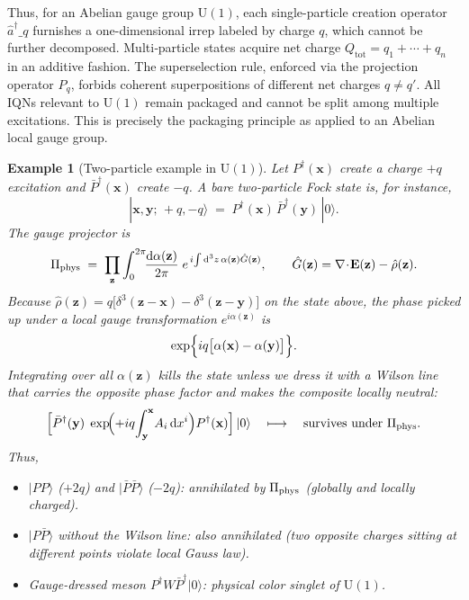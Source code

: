 \documentclass[12pt,a4paper]{article}
\newtheorem{example}{Example}
\begin{document}
Thus, for an Abelian gauge group $\mathrm{U}(1)$, each single-particle creation operator $\hat a^\dagger\_q$ furnishes a one-dimensional irrep labeled by charge $q$, which cannot be further decomposed.
Multi‐particle states acquire net charge $Q_\text{tot}= q_1+\cdots +q_n$ in an additive fashion.
The superselection rule, enforced via the projection operator $P_q$, forbids coherent superpositions of different net charges $q\neq q'$. 
All IQNs relevant to $\mathrm{U}(1)$ remain packaged and cannot be split among multiple excitations.
This is precisely the packaging principle as applied to an Abelian local gauge group.


\begin{example}[Two-particle example in $\mathrm{U}(1)$]	
	Let $P^\dagger(\mathbf x)$ create a charge $+q$ excitation and
	$\bar P^\dagger(\mathbf x)$ create $-q$.
	A bare two-particle Fock state is, for instance,
	$$
	|\mathbf x,\mathbf y;\,+q,-q\rangle\;=\;
	P^\dagger(\mathbf x)\,\bar P^\dagger(\mathbf y)\,|0\rangle .
	$$
	The gauge projector is
	$$
	\Pi_{\rm phys}\;=\;
	\prod_{\mathbf z}\int_{0}^{2\pi}\!\!\frac{{\rm d}\alpha(\mathbf z)}{2\pi}
	\;e^{\,i\!\int{\rm d}^3z\,\alpha(\mathbf z)\hat G(\mathbf z)} ,
	\qquad
	\hat G(\mathbf z)=\nabla\!\cdot\!\mathbf E(\mathbf z)-\hat\rho(\mathbf z).
	$$
	Because $\hat\rho(\mathbf z)=q\bigl[\delta^{3}(\mathbf z-\mathbf x)-\delta^{3}(\mathbf z-\mathbf y)\bigr]$ on the state above, the phase picked up under a local gauge transformation
	$e^{i\alpha(\mathbf z)}$ is	
	$$
	\exp \Bigl\{ i q \bigl[\alpha(\mathbf x)-\alpha(\mathbf y)\bigr] \Bigr\}.
	$$
	Integrating over all $\alpha(\mathbf z)$ kills the state unless we dress it with a Wilson line that carries the opposite phase factor and makes the composite locally neutral:
	$$
	\Bigl[\bar P^\dagger(\mathbf y)\;
	\exp\!\Bigl(+iq\!\int_{\mathbf y}^{\mathbf x}\!A_i\,{\rm d}x^{i}\Bigr)
	P^\dagger(\mathbf x)\Bigr]\,|0\rangle
	\quad\longmapsto\quad
	\text{survives under } \Pi_{\rm phys}.
	$$
	Thus,
	\begin{itemize}
		\item $|P P\rangle$ ($+2q$) and $|\bar P\bar P\rangle$ ($-2q$):
		annihilated by $\Pi_{\rm phys}$ (globally and locally charged).
		
		\item $|P\bar P\rangle$ without the Wilson line:
		also annihilated (two opposite charges sitting at different points violate local Gauss law).
		
		\item Gauge-dressed meson $P^\dagger W\bar P^\dagger|0\rangle$:
		physical color singlet of $\mathrm{U}(1)$.
	\end{itemize}
\end{example}
\end{document}
